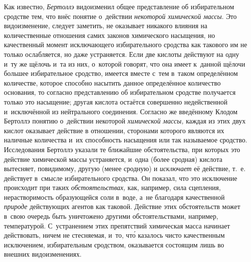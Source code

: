 Как известно, {\em Бертоллэ} видоизменил общее представление об избирательном
сродстве тем, что внёс понятие о~действии {\em некоторой химической массы}. Это
видоизменение, следует заметить, не оказывает никакого влияния на
количественные отношения самих законов химического насыщения, но качественный
момент исключающего избирательного сродства как такового им не только
ослабляется, но даже устраняется. Если две кислоты действуют на одну и~ту же
щёлочь и~та из них, о~которой говорят, что она имеет к~данной щёлочи большее
избирательное сродство, имеется вместе с~тем в~таком определённом количестве,
которое способно насытить данное определённое количество основания, то согласно
представлению об избирательном сродстве получается только это насыщение; другая кислота
остаётся совершенно недейственной и~исключённой из нейтрального соединения.
Согласно же введённому Клодом Бертоллэ понятию о~действии некоторой
{\em химической массы,} каждая из этих двух кислот оказывает действие в
отношении, сторонами которого являются их наличные количества и~их способность
насыщения или так называемое сродство. Исследования Бертоллэ указали те
ближайшие обстоятельства, при которых это действие химической массы
устраняется, и~одна (более сродная) кислота вытесняет, повидимому, другую
(менее сродную) и {\em исключает} её действие, т.~е. действует в~смысле
избирательного сродства. Он показал, что это исключение происходит при таких
{\em обстоятельствах,} как, например, сила сцепления, нерастворимость
образующейся соли в~воде, а~не благодаря качественной {\em природе} действующих
агентов как таковой. Действие этих обстоятельств может в~свою очередь быть
уничтожено другими обстоятельствами, например, температурой. С~устранением этих
препятствий химическая масса начинает действовать, ничем не стесняемая, и~то,
чт\'{о} казалось чисто качественным исключением, избирательным сродством,
оказывается состоящим лишь во внешних видоизменениях.

